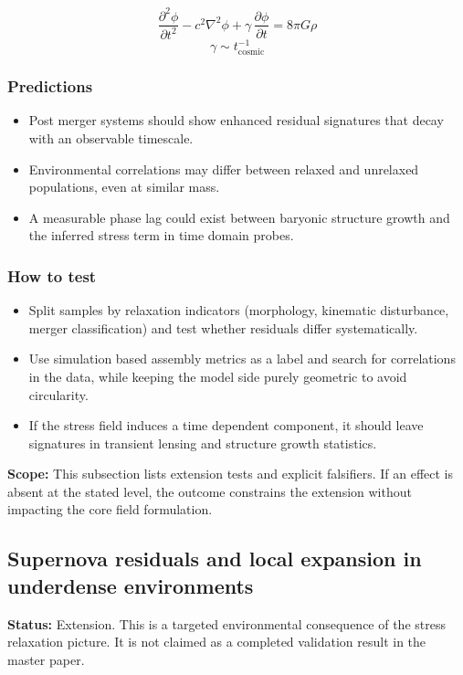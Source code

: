 \documentclass[11pt,a4paper]{article}
\begin{document}
$$
\frac{\partial^2 \phi}{\partial t^2} - c^2\nabla^2\phi + \gamma\,\frac{\partial \phi}{\partial t} = 8\pi G\rho
$$
$$
\gamma \sim t_{\mathrm{cosmic}}^{-1}
$$

\subsubsection{Predictions}
\begin{itemize}
  \item Post merger systems should show enhanced residual signatures that decay with an observable timescale.
  \item Environmental correlations may differ between relaxed and unrelaxed populations, even at similar mass.
  \item A measurable phase lag could exist between baryonic structure growth and the inferred stress term in time domain probes.
\end{itemize}

\subsubsection{How to test}
\begin{itemize}
  \item Split samples by relaxation indicators (morphology, kinematic disturbance, merger classification) and test whether residuals differ systematically.
  \item Use simulation based assembly metrics as a label and search for correlations in the data, while keeping the model side purely geometric to avoid circularity.
  \item If the stress field induces a time dependent component, it should leave signatures in transient lensing and structure growth statistics.
\end{itemize}

\begin{mdframed}[linecolor=accent,linewidth=0.5pt,backgroundcolor=callout-bg,leftline=true,rightline=true,topline=true,bottomline=true,innerleftmargin=8pt,innerrightmargin=8pt,innertopmargin=6pt,innerbottommargin=6pt]
\textbf{Scope:} This subsection lists extension tests and explicit falsifiers. If an effect is absent at the stated level, the outcome constrains the extension without impacting the core field formulation.
\end{mdframed}

\subsection{Supernova residuals and local expansion in underdense environments}
\begin{mdframed}[linecolor=accent,linewidth=0.5pt,backgroundcolor=callout-bg,leftline=true,rightline=true,topline=true,bottomline=true,innerleftmargin=8pt,innerrightmargin=8pt,innertopmargin=6pt,innerbottommargin=6pt]
\textbf{Status:} Extension. This is a targeted environmental consequence of the stress relaxation picture. It is not claimed as a completed validation result in the master paper.
\end{mdframed}
\end{document}
